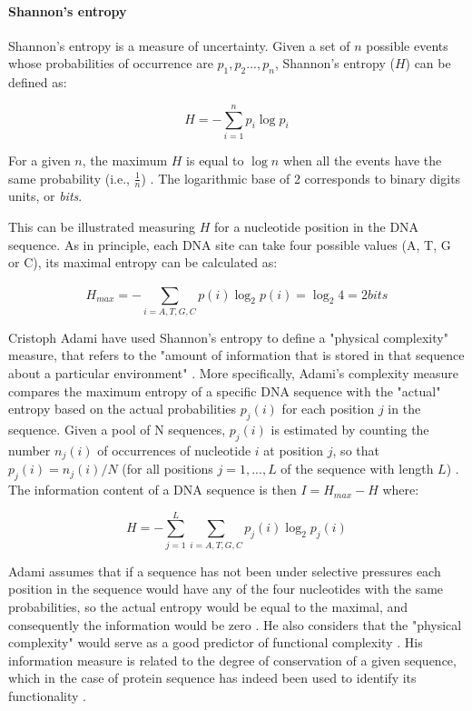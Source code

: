 \paragraph{Shannon's entropy}

Shannon's entropy is a measure of uncertainty. Given a set of $n$ possible events whose probabilities of occurrence are $p_{1}, p_{2}...,p_{n}$, Shannon's entropy ($H$) can be defined as:

$$H = -\sum_{i=1}^{n} p_{i} \log p_{i}$$

For a given $n$, the maximum $H$ is equal to $\log n$ when all the events have the same probability (i.e., $\frac{1}{n}$) \citep{Shannon1948}. The logarithmic base of 2 corresponds to binary digits units, or \textit{bits}.

This can be illustrated measuring $H$ for a nucleotide position in the DNA sequence. As in principle, each DNA site can take four possible values (A, T, G or C), its maximal entropy can be calculated as:

$$H_{max} = -\sum_{i=A,T,G,C}^{} p(i) \log_{2} p(i) = \log_{2} 4 = 2 bits $$

Cristoph Adami have used Shannon's entropy to define a "physical complexity" measure, that refers to the "amount of information that is stored in that sequence about a particular environment" \citep{Adami2002}.
%
More specifically, Adami's complexity measure compares the maximum entropy of a specific DNA sequence with the "actual" entropy based on the actual probabilities $p_{j}(i)$ for each position $j$ in the sequence. Given a pool of N sequences, $p_{j}(i)$ is estimated by counting the number $n_{j}(i)$  of occurrences of nucleotide $i$ at position $j$, so that $p_{j}(i)=n_{j}(i)/N$ (for all positions $j =1,...,L$ of the sequence with length $L$) \citep{Adami2000}. 
The information content of a DNA sequence is then $I = H_{max} - H $  where:

$$H = -\sum_{j=1}^{L} \sum_{i=A,T,G,C}^{} p_{j}(i) \log_{2} p_{j}(i) $$

Adami assumes that if a sequence has not been under selective pressures each position in the sequence would have any of the four nucleotides with the same probabilities, so the actual entropy would be equal to the maximal, and consequently the information would be zero \citep{Adami2002}. 
He also considers that the "physical complexity" would serve as a good predictor of functional complexity \citep{Adami2004}. 
His information measure is related to the degree of conservation of a given sequence, which in the case of protein sequence has indeed been used to identify its functionality \citep{Casari1995,Kellis2003,Hannenhalli2000}.


